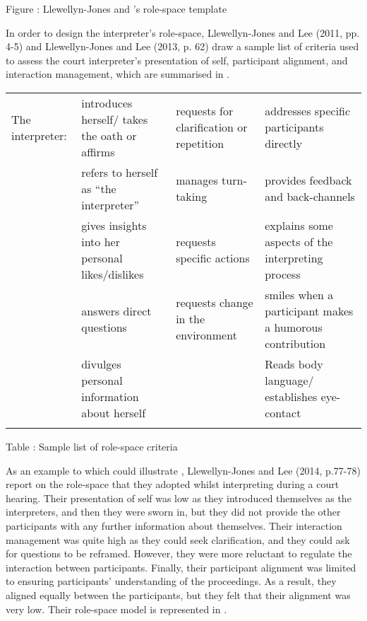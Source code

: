 \documentclass[output=paper]{langsci/langscibook}
\begin{document}
  
 

\begin{stylecaption}
Figure : Llewellyn-Jones and \citet{Lee2014}'s role-space template
\end{stylecaption}

In order to design the interpreter’s role-space, Llewellyn-Jones and Lee (2011, pp. 4-5) and Llewellyn-Jones and Lee (2013, p. 62) draw a sample list of criteria used to assess the court interpreter’s presentation of self, participant alignment, and interaction management, which are summarised in . 

\begin{tabularx}{\textwidth}{XXXX}
\lsptoprule
 The interpreter: & introduces herself/ takes the oath or affirms & requests for clarification or repetition & addresses specific participants directly\\
& refers to herself as “the interpreter” & manages turn-taking & provides feedback and back-channels\\
& gives insights into her personal likes/dislikes & requests specific actions & explains some aspects of the interpreting process\\
& answers direct questions & requests change in the environment & smiles when a participant makes a humorous contribution\\
& divulges personal information about herself &  & Reads body language/ establishes eye-contact\\
\lspbottomrule
\end{tabularx}
\begin{stylecaption}
Table : Sample list of role-space criteria
\end{stylecaption}

As an example to which could illustrate , Llewellyn-Jones and Lee (2014, p.77-78) report on the role-space that they adopted whilst interpreting during a court hearing. Their presentation of self was low as they introduced themselves as the interpreters, and then they were sworn in, but they did not provide the other participants with any further information about themselves. Their interaction management was quite high as they could seek clarification, and they could ask for questions to be reframed. However, they were more reluctant to regulate the interaction between participants. Finally, their participant alignment was limited to ensuring participants’ understanding of the proceedings. As a result, they aligned equally between the participants, but they felt that their alignment was very low. Their role-space model is represented in . 
\end{document}
